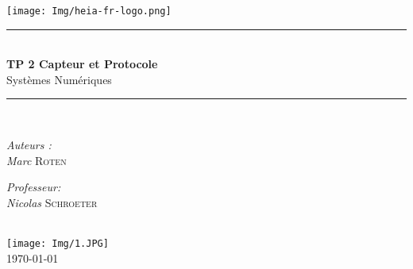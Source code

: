 \documentclass[11pt,b5paper]{book} %
\begin{document}
	
	
    \begin{titlepage}
        \begin{center}
            \texttt{[image: Img/heia-fr-logo.png]}\\[1cm]
            
            \rule{\linewidth}{0.3mm} \\[0.3cm]
            {\huge \bfseries TP 2 Capteur et Protocole\\[0.5cm]} 
            {\Large  Systèmes Numériques }
            \rule{\linewidth}{0.3mm} \\[0.8cm]
            \noindent
            \begin{minipage}[t]{0.4\textwidth}
                \begin{flushleft} \large
                    \emph{Auteurs :}\\
 \textsl{Marc} \textsc{ Roten}\\                     
                \end{flushleft}
            \end{minipage}
            \begin{minipage}[t]{0.4\textwidth} 
                \begin{flushright} \large
                    \emph{Professeur:}\\
                    \textsl{Nicolas} \textsc{ Schroeter}\\ 
                \end{flushright} 
                \vfill
            \end{minipage}\\[1cm]
            \texttt{[image: Img/1.JPG]}\\[0.6cm]
            \vspace*{1\baselineskip}
            \today 
        \end{center}
    \end{titlepage}
    	\renewcommand\contentsname{Table of Contents} %
	\tableofcontents
    \clearpage
	
	
	
	
	\null\newpage %

	\thispagestyle{empty}
	\null\newpage
\end{document}
